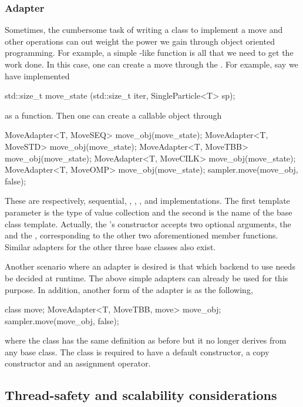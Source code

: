 \subsubsection{Adapter}
\label{ssub:Adapter}

Sometimes, the cumbersome task of writing a class to implement a move and
other operations can out weight the power we gain through object oriented
programming. For example, a simple -like function is all
that we need to get the work done. In this case, one can create a move through
the . For example, say we have implemented
\begin{cppcode}
std::size_t move_state (std::size_t iter, SingleParticle<T> sp);
\end{cppcode}
as a function. Then one can create a callable object through
\begin{cppcode}
MoveAdapter<T, MoveSEQ>  move_obj(move_state);
MoveAdapter<T, MoveSTD>  move_obj(move_state);
MoveAdapter<T, MoveTBB>  move_obj(move_state);
MoveAdapter<T, MoveCILK> move_obj(move_state);
MoveAdapter<T, MoveOMP>  move_obj(move_state);
sampler.move(move_obj, false);
\end{cppcode}
These are respectively, sequential, \cppoo{} , \tbb,
\cilk, and \openmp implementations. The first template parameter is the type
of value collection and the second is the name of the base class template.
Actually, the 's constructor accepts two optional
arguments, the  and the ,
corresponding to the other two aforementioned member functions. Similar
adapters for the other three base classes also exist.

Another scenario where an adapter is desired is that which backend to use
needs be decided at runtime. The above simple adapters can already be used for
this purpose. In addition, another form of the adapter is as the following,
\begin{cppcode}
class move;
MoveAdapter<T, MoveTBB, move> move_obj;
sampler.move(move_obj, false);
\end{cppcode}
where the class  has the same definition as before but it no
longer derives from any base class. The class  is required to
have a default constructor, a copy constructor and an assignment operator.

\subsection{Thread-safety and scalability considerations}
\label{sub:Thread-safety and scalability considerations}

